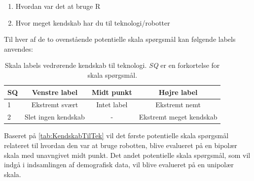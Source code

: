%
\begin{enumerate}
  \item Hvordan var det at bruge R
  \item Hvor meget kendskab har du til teknologi/robotter\blankline 
\end{enumerate}
%
Til hver af de to ovenstående potentielle skala spørgsmål kan følgende labels anvendes:
%
\begin{table}[H]
	\centering 
	\begin{tabular}{l|c|c|c}
		SQ     & Venstre label & Midt punkt & Højre label \\\hline
		1   & Ekstremt svært & Intet label & Ekstremt nemt          \\\hline
		2   & Slet ingen kendskab & - & Ekstremt meget kendskab 
	\end{tabular}
\caption{Skala labels vedrørende kendskab til teknologi. \textit{SQ} er en forkortelse for skala spørgsmål.}
	\label{tab:KendskabTilTek}
\end{table}
\noindent
%
Baseret på \autoref{tab:KendskabTilTek} vil det første potentielle skala spørgsmål relateret til hvordan den var at bruge robotten, blive evalueret på en bipolær skala med unavngivet midt punkt. Det andet potentielle skala spørgsmål, som vil indgå i indsamlingen af demografisk data, vil blive evalueret på en unipolær skala. 
\newpage
%
